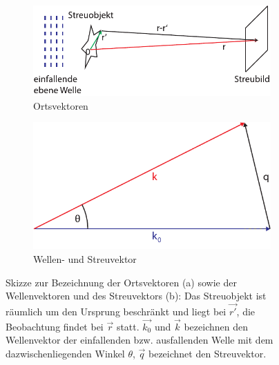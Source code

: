 \begin{figure}
	\centering
	\begin{subfigure}[b]{0.49\textwidth}
		\includegraphics[width=\textwidth]{images/bornr.pdf}
		\caption{Ortsvektoren}
		\label{fig:bornr}
	\end{subfigure}
	\begin{subfigure}[b]{0.49\textwidth}
		\includegraphics[width=\textwidth]{images/bornq.pdf}
		\caption{Wellen- und Streuvektor}
		\label{fig:bornq}
	\end{subfigure}
	\caption[Geometrie bei Born Näherung]{Skizze zur Bezeichnung der Ortsvektoren (a) sowie
		 der Wellenvektoren und des Streuvektors (b): Das Streuobjekt ist räumlich um den Ursprung beschränkt und liegt bei $\vec{r'}$, die Beobachtung findet bei $\vec{r}$ statt. $\vec{k_{0}}$ und $\vec{k}$ bezeichnen den Wellenvektor der einfallenden bzw. ausfallenden Welle mit dem dazwischenliegenden Winkel $\theta$, $\vec{q}$ bezeichnet den Streuvektor.}
\end{figure} 


